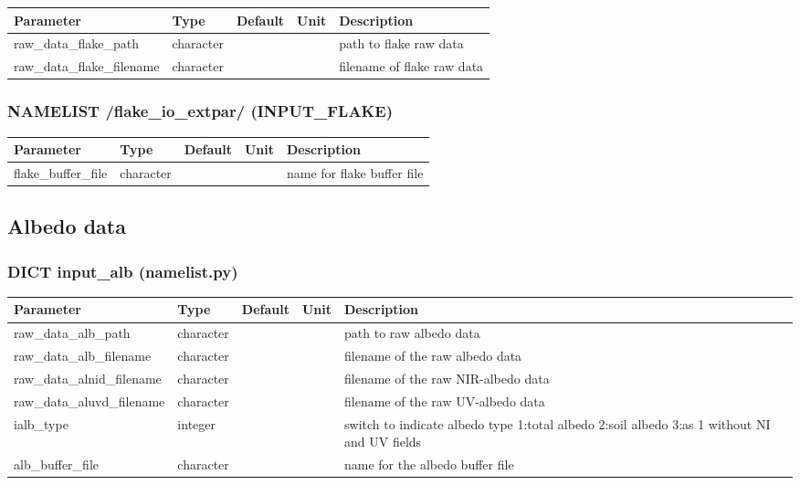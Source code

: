 \documentclass[a4paper,10pt,DIV14,BCOR1cm,titlepage,twoside]{scrartcl}
\providecommand{\tabularnewline}{\\}
\begin{document}
\begin{longtable}{|p{4cm}|p{1.5cm}|p{1.5cm}|p{1cm}|p{6cm}|}
\hline 
\textbf{Parameter}& \textbf{Type}& \textbf{Default}& \textbf{Unit}& \textbf{Description}
\tabularnewline
\hline
\endhead
\hline 
raw\_data\_flake\_path & character & &  & path to flake raw data \tabularnewline
\hline 
raw\_data\_flake\_filename & character & &  & filename of flake raw data \tabularnewline
\hline
\bottomrule
\end{longtable}

\subsubsection*{NAMELIST /flake\_io\_extpar/ (INPUT\_FLAKE)}
\begin{longtable}{|p{4cm}|p{1.5cm}|p{1.5cm}|p{1cm}|p{6cm}|}
\hline 
\textbf{Parameter}& \textbf{Type}& \textbf{Default}& \textbf{Unit}& \textbf{Description}
\tabularnewline
\hline
\endhead
\hline
flake\_buffer\_file & character & &  & name for flake buffer file
\tabularnewline
\bottomrule
\end{longtable}

\subsection{Albedo data}\label{namelist_input_for_extpar_albedo}

\subsubsection*{DICT input\_alb (namelist.py)}

\begin{longtable}{|p{4cm}|p{1.5cm}|p{1.5cm}|p{1cm}|p{6cm}|}
\hline 
\textbf{Parameter}& \textbf{Type}& \textbf{Default}& \textbf{Unit}& \textbf{Description}
\tabularnewline
\hline
\endhead
\hline 
raw\_data\_alb\_path & character & & & path to raw albedo data
\tabularnewline
\hline
raw\_data\_alb\_filename & character & & & filename of the raw albedo data
\tabularnewline
\hline
raw\_data\_alnid\_filename & character & & & filename of the raw NIR-albedo data
\tabularnewline
\hline
raw\_data\_aluvd\_filename & character & & & filename of the raw UV-albedo data
\tabularnewline
\hline
ialb\_type & integer &  & & switch to indicate albedo type 1:total albedo 2:soil albedo 3:as 1 without NI and UV fields
\tabularnewline
\hline
alb\_buffer\_file & character & & & name for the albedo buffer file
\tabularnewline
\bottomrule
\end{longtable}
\end{document}
